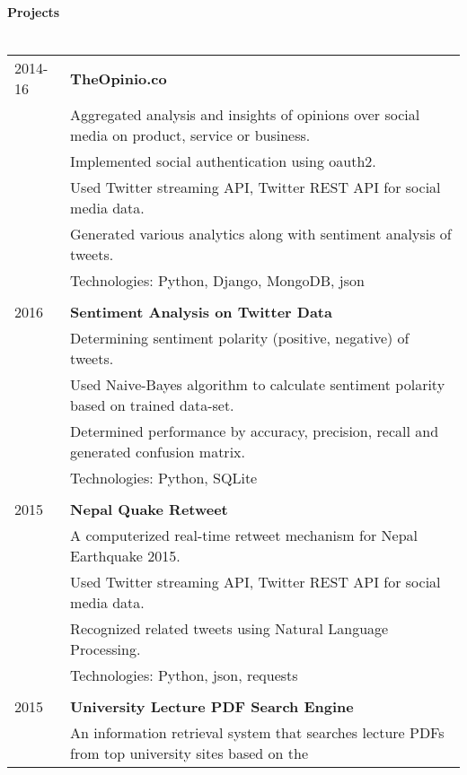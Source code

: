 \documentclass[letterpaper,10pt,oneside]{article}
\newcommand{\nextitem}{\par\hspace*{\labelsep}\textbullet\hspace*{\labelsep}}
\begin{document}
\paragraph{\large{Projects}\\\\}
\noindent \begin{tabular}{l l}
 2014-16 & \textbf{TheOpinio.co} \\
         & Aggregated analysis and insights of opinions over social media on product, service or business. \\
         & \footnotesize{\nextitem  Implemented social authentication using oauth2.} \\
         & \footnotesize{\nextitem  Used Twitter streaming API, Twitter REST API for social media data.} \\
         & \footnotesize{\nextitem  Generated various analytics along with sentiment analysis of tweets.} \\
         & Technologies: Python, Django, MongoDB, json \\
         \\
 2016    & \textbf{Sentiment Analysis on Twitter Data} \\
         & Determining sentiment polarity (positive, negative) of tweets. \\
         & \footnotesize{\nextitem Used Naive-Bayes algorithm to calculate sentiment polarity based on trained data-set.} \\
         & \footnotesize{\nextitem Determined performance by accuracy, precision, recall and generated confusion matrix.} \\
         & Technologies: Python, SQLite \\
         \\
 2015    & \textbf{Nepal Quake Retweet} \\
         & A computerized real-time retweet mechanism for Nepal Earthquake 2015. \\
         & \footnotesize{\nextitem  Used Twitter streaming API, Twitter REST API for social media data.} \\
         & \footnotesize{\nextitem Recognized related tweets using Natural Language Processing.} \\
         & Technologies: Python, json, requests \\
         \\
 2015    & \textbf{University Lecture PDF Search Engine} \\
         & An information retrieval system that searches lecture PDFs from top university sites based on the \\

\end{tabular}
\end{document}
